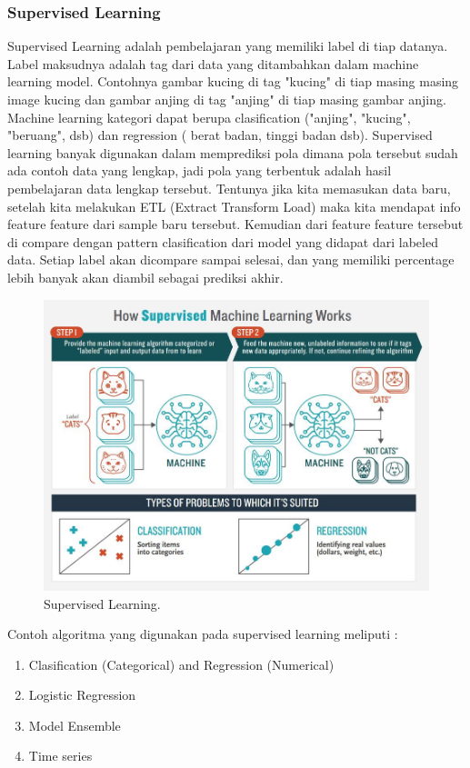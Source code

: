 \subsubsection{Supervised Learning}
\hfill\break
Supervised Learning adalah pembelajaran yang memiliki label di tiap datanya. Label maksudnya adalah tag dari data yang ditambahkan dalam machine learning model. Contohnya gambar kucing di tag "kucing" di tiap masing masing image kucing dan gambar anjing di tag "anjing" di tiap masing gambar anjing. Machine learning kategori dapat berupa clasification ("anjing", "kucing", "beruang", dsb) dan regression ( berat badan, tinggi badan dsb). Supervised learning banyak digunakan dalam memprediksi pola dimana pola tersebut sudah ada contoh data yang lengkap, jadi pola yang terbentuk adalah hasil pembelajaran data lengkap tersebut. Tentunya jika kita memasukan data baru, setelah kita melakukan ETL (Extract Transform Load) maka kita mendapat info feature feature dari sample baru tersebut. Kemudian dari feature feature tersebut di compare dengan pattern clasification dari model yang didapat dari labeled data. Setiap label akan dicompare sampai selesai, dan yang memiliki percentage lebih banyak akan diambil sebagai prediksi akhir.

\begin{figure}[H]
	\includegraphics[width=1\textwidth]{figures/1174006/chapter1/supervisedlearning.jpeg}
	\centering
	\caption{Supervised Learning.}
\end{figure}
\noindent
Contoh algoritma yang digunakan pada supervised learning meliputi :
\begin{enumerate}
	\item Clasification (Categorical) and Regression (Numerical)
    \item Logistic Regression
    \item Model Ensemble
	\item Time series
\end{enumerate}

